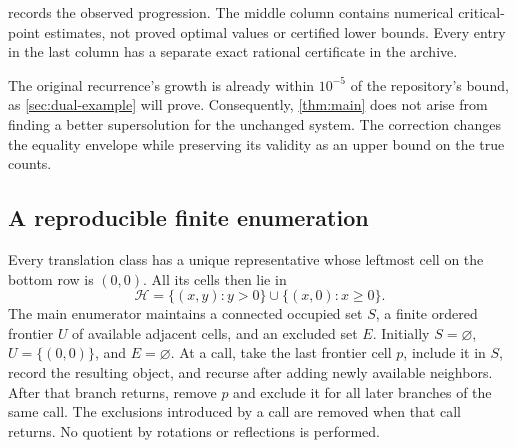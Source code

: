 \documentclass[11pt,a4paper]{article}
\theoremstyle{definition}
\theoremstyle{remark}
\begin{document}
 records the observed progression. The middle column
contains numerical critical-point estimates, not proved optimal values or
certified lower bounds. Every entry in the last column has a separate
exact rational certificate in the archive.

\begin{table}[htbp]
\centering\small

\caption{Progress under exact-prefix correction. Numerical estimates and
rigorous upper certificates are deliberately separated.}
\label{tab:progress}
\end{table}

The original recurrence's growth is already within $10^{-5}$ of the
repository's bound, as \cref{sec:dual-example} will prove. Consequently,
\cref{thm:main} does not arise from finding a better supersolution for the
unchanged system. The correction changes the equality envelope while
preserving its validity as an upper bound on the true counts.

\subsection{A reproducible finite enumeration}
Every translation class has a unique representative whose leftmost cell on
the bottom row is $(0,0)$. All its cells then lie in
\[
 \mathcal H=\{(x,y):y>0\}\cup\{(x,0):x\geq0\}.
\]
The main enumerator maintains a connected occupied set $S$, a finite ordered
frontier $U$ of available adjacent cells, and an excluded set $E$.
Initially $S=\varnothing$, $U=\{(0,0)\}$, and $E=\varnothing$.
At a call, take the last frontier cell $p$, include it in $S$, record the
resulting object, and recurse after adding newly available neighbors.
After that branch returns, remove $p$ and exclude it for all later branches
of the same call. The exclusions introduced by a call are removed when that
call returns. No quotient by rotations or reflections is performed.
\end{document}
